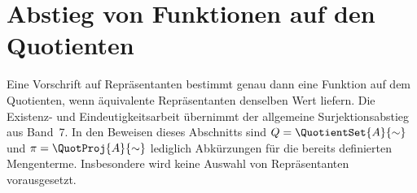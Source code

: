 \documentclass[main.tex]{subfiles}
\begin{document}
\begin{tabproofsplitwide}
  \closeproofpartwide
\end{tabproofsplitwide}

\section{Abstieg von Funktionen auf den Quotienten}

Eine Vorschrift auf Repräsentanten bestimmt genau dann eine Funktion auf
dem Quotienten, wenn äquivalente Repräsentanten denselben Wert liefern.
Die Existenz- und Eindeutigkeitsarbeit übernimmt der allgemeine
Surjektionsabstieg aus Band~7. In den Beweisen dieses Abschnitts sind
\(Q=\QuotientSet{A}{\sim}\) und
\(\pi=\QuotProj{A}{\sim}\) lediglich Abkürzungen für die bereits
definierten Mengenterme. Insbesondere wird keine Auswahl von
Repräsentanten vorausgesetzt.
\end{document}
